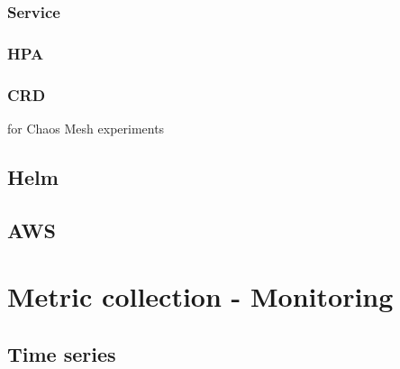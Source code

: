 \subsubsection{Service} \label{k8s-service}

\subsubsection{HPA}

\subsubsection{CRD}

for Chaos Mesh experiments

\subsection{Helm}

\subsection{AWS}


\section{Metric collection - Monitoring}

\subsection{Time series}

